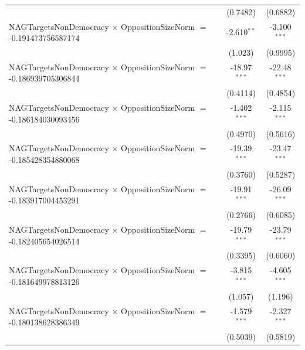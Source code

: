 \begin{tabular}{lcc}
                                                                                & (0.7482)             & (0.6882)\\   
   NAGTargetsNonDemocracy $\times$ OppositionSizeNorm $=$ -0.191473756587174    & -2.610$^{**}$        & -3.100$^{***}$\\   
                                                                                & (1.023)              & (0.9995)\\   
   NAGTargetsNonDemocracy $\times$ OppositionSizeNorm $=$ -0.186939705306844    & -18.97$^{***}$       & -22.48$^{***}$\\   
                                                                                & (0.4114)             & (0.4854)\\   
   NAGTargetsNonDemocracy $\times$ OppositionSizeNorm $=$ -0.186184030093456    & -1.402$^{***}$       & -2.115$^{***}$\\   
                                                                                & (0.4970)             & (0.5616)\\   
   NAGTargetsNonDemocracy $\times$ OppositionSizeNorm $=$ -0.185428354880068    & -19.39$^{***}$       & -23.47$^{***}$\\   
                                                                                & (0.3760)             & (0.5287)\\   
   NAGTargetsNonDemocracy $\times$ OppositionSizeNorm $=$ -0.183917004453291    & -19.91$^{***}$       & -26.09$^{***}$\\   
                                                                                & (0.2766)             & (0.6085)\\   
   NAGTargetsNonDemocracy $\times$ OppositionSizeNorm $=$ -0.182405654026514    & -19.79$^{***}$       & -23.79$^{***}$\\   
                                                                                & (0.3395)             & (0.6060)\\   
   NAGTargetsNonDemocracy $\times$ OppositionSizeNorm $=$ -0.181649978813126    & -3.815$^{***}$       & -4.605$^{***}$\\   
                                                                                & (1.057)              & (1.196)\\   
   NAGTargetsNonDemocracy $\times$ OppositionSizeNorm $=$ -0.180138628386349    & -1.579$^{***}$       & -2.327$^{***}$\\   
                                                                                & (0.5039)             & (0.5819)\\   

\end{tabular}
